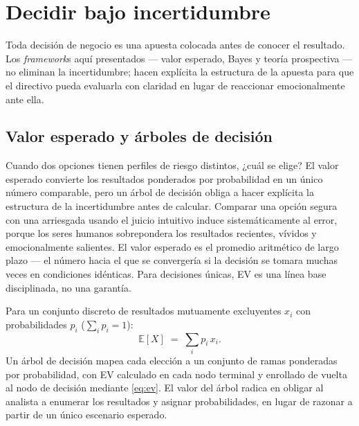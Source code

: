\chapter{Decidir bajo incertidumbre}\label{ch:decisions-under-uncertainty}


Toda decisión de negocio es una apuesta colocada antes de conocer el resultado. Los \emph{framework}s
aquí presentados --- valor esperado, Bayes y teoría prospectiva --- no eliminan la incertidumbre; hacen
explícita la estructura de la apuesta para que el directivo pueda evaluarla con claridad en lugar de
reaccionar emocionalmente ante ella.

\section{Valor esperado y árboles de decisión}\label{sec:expected-value}

Cuando dos opciones tienen perfiles de riesgo distintos, ¿cuál se elige? El valor esperado convierte
los resultados ponderados por probabilidad en un único número comparable, pero un árbol de decisión
obliga a hacer explícita la estructura de la incertidumbre antes de calcular. Comparar una opción
segura con una arriesgada usando el juicio intuitivo induce sistemáticamente al error, porque los
seres humanos sobrepondera los resultados recientes, vívidos y emocionalmente salientes. El valor
esperado es el promedio aritmético de largo plazo --- el número hacia el que se convergería si la
decisión se tomara muchas veces en condiciones idénticas. Para decisiones únicas, EV es una línea
base disciplinada, no una garantía.

Para un conjunto discreto de resultados mutuamente excluyentes \(x_i\) con probabilidades \(p_i\)
(\(\sum_i p_i = 1\)):
\begin{equation}\label{eq:ev}
  \mathbb{E}[X] \;=\; \sum_i p_i\, x_i.
\end{equation}
Un árbol de decisión mapea cada elección a un conjunto de ramas ponderadas por probabilidad, con EV
calculado en cada nodo terminal y enrollado de vuelta al nodo de decisión mediante \cref{eq:ev}. El
valor del árbol radica en obligar al analista a enumerar los resultados y asignar probabilidades, en
lugar de razonar a partir de un único escenario esperado.

